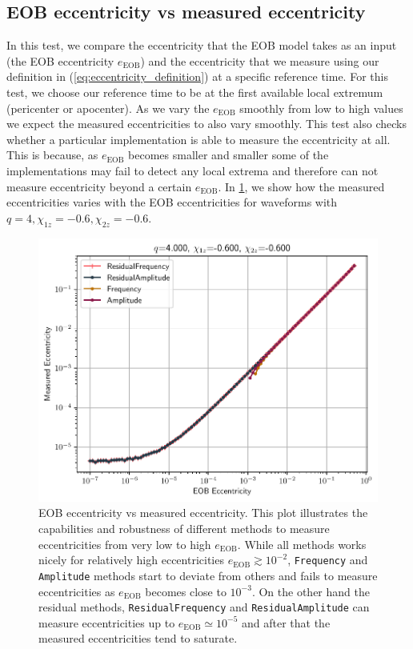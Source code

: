 \documentclass[aps,prd,amsmath,floats,floatfix, twocolumn,
superscriptaddress,nofootinbib,showpacs]{revtex4-1}
\begin{document}
\subsection{EOB eccentricity vs measured eccentricity}
\label{sec:eob-eccentricity-vs-measured-eccentricity}
In this test, we compare the eccentricity that the EOB model takes as an input (the EOB eccentricity $e_{\text{EOB}}$) and the eccentricity that we measure using
our definition in (\ref{eq:eccentricity_definition}) at a specific reference time. For this test, we choose our reference time to be at the first available local
extremum (pericenter or apocenter). As we vary the $e_{\text{EOB}}$ smoothly from low to high values we expect the measured eccentricities to also vary smoothly.
This test also checks whether a particular implementation is able to measure the eccentricity at all. This is because, as $e_{\text{EOB}}$ becomes smaller and smaller
some of the implementations may fail to detect any local extrema and therefore can not measure eccentricity beyond a certain $e_{\text{EOB}}$. In \ref{fig:eob_vs_measured_ecc},
we show how the measured eccentricities varies with the EOB eccentricities for waveforms with $q=4, \chi_{1z}=-0.6, \chi_{2z}=-0.6$.


\begin{figure}[thb]
\includegraphics[width=\columnwidth]{test_eob_vs_measured_ecc_example}
\caption{EOB eccentricity vs measured eccentricity. This plot illustrates the capabilities and robustness of different methods to measure eccentricities from very low to high $e_{\text{EOB}}$.
  While all methods works nicely for relatively high eccentricities $e_{\text{EOB}} \gtrsim 10^{-2}$, \texttt{Frequency} and \texttt{Amplitude} methods start to deviate from others
  and fails to measure eccentricities as $e_{\text{EOB}}$ becomes close to $10^{-3}$. On the other hand the residual methods, \texttt{ResidualFrequency} and \texttt{ResidualAmplitude}
can measure eccentricities up to $e_{\text{EOB}} \simeq 10^{-5}$ and after that the measured eccentricities tend to saturate.}
\label{fig:eob_vs_measured_ecc}
\end{figure}
\end{document}
